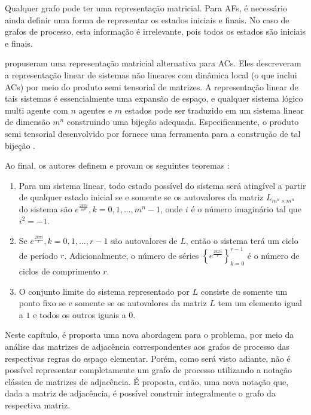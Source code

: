 \documentclass[12pt,a4paper]{article}
\begin{document}
Qualquer grafo pode ter uma representação matricial. Para AFs, é necessário
ainda definir uma forma de representar os estados iniciais e finais. No
caso de grafos de processo, esta informação é irrelevante, pois todos
os estados são iniciais e finais.

 propuseram uma representação matricial alternativa para
ACs. Eles descreveram a representação linear de sistemas não lineares com
dinâmica local (o que inclui ACs) por meio do produto semi tensorial de
matrizes. A representação linear de tais sistemas é essencialmente uma expansão de
espaço, e qualquer sistema lógico multi agente com $n$ agentes e $m$ estados
pode ser traduzido em um sistema linear de dimensão $m^n$ construindo uma
bijeção adequada. Especificamente, o produto semi tensorial desenvolvido
por  fornece uma ferramenta para a construção de
tal bijeção .  

Ao final, os autores definem e provam os seguintes teoremas
:

\begin{enumerate}
\item Para um sistema linear, todo estado possível do sistema será
atingível a partir de qualquer estado inicial se e somente se os autovalores
da matriz $L_{m^n \times m^n}$ do sistema são
$e^{\frac{2k\pi i}{m^n}},k=0,1,\ldots,m^n-1$, onde $i$ é o número
imaginário tal que $i^2=-1$.

\item Se $e^{\frac{2k\pi i}{r}},k=0,1,\ldots,r-1$ são autovalores de $L$,
então o sistema terá um ciclo de período $r$. Adicionalmente,
o número de séries $\left\{e^{\frac{2k\pi i}{r}}\right\}^{r-1}_{k=0}$
é o número de ciclos de comprimento $r$.

\item O conjunto limite do sistema representado por $L$ consiste de somente um
ponto fixo se e somente se os autovalores da matriz $L$
tem um elemento igual a $1$ e todos os outros iguais a $0$.
\end{enumerate}

Neste capítulo, é proposta uma nova abordagem para o problema, por meio da
análise das matrizes de adjacência correspondentes aos grafos de processo
das respectivas regras do espaço elementar. Porém, como será visto adiante,
não é possível representar completamente um grafo de processo utilizando a
notação clássica de matrizes de adjacência. É proposta, então, uma
nova notação que, dada a matriz de adjacência, é possível construir
integralmente o grafo da respectiva matriz.
\end{document}
